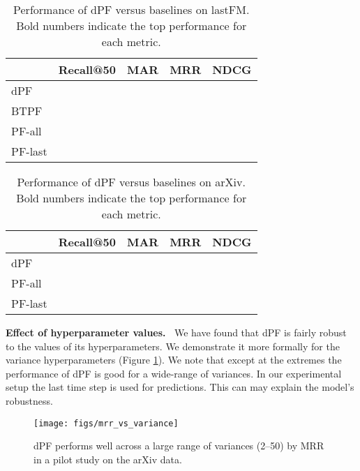 \documentclass{sig-alternate}
\newcommand{\mypar}[1]{\vspace{0.1in}\noindent \textbf{#1 \,}}
\begin{document}
\begin{table}[h]
\begin{center}
\begin{tabular}{p{0.75in}cccc}
\hline
           & Recall@50 & MAR & MRR & NDCG \\ \hline 
dPF        & {\bf } & {\bf } & {\bf } & {\bf } \\ 
BTPF \citep{lxiong:10:bptf}   &  &  &  & \\ 
PF-all \citep{Gopalan:2013b}  &  &  &  & \\ 
PF-last \citep{Gopalan:2013b} &  &  &  & \\ \hline
\end{tabular}
\caption{Performance of dPF versus baselines on lastFM. Bold numbers
indicate the top performance for each metric.}
\label{tab:lastFM}
\end{center}
\end{table}



\begin{table}[h]
\begin{center}
\begin{tabular}{p{0.6in}cccc}
\hline
           & Recall@50 & MAR   & MRR    & NDCG \\ \hline 
dPF        & {\bf } & {\bf }  & {\bf } & {\bf } \\ 
PF-all  \citep{Gopalan:2013b} & & & & \\ 
PF-last \citep{Gopalan:2013b} & & & & \\ \hline
\end{tabular}
\caption{Performance of dPF versus baselines on arXiv. Bold numbers indicate
the top performance for each metric.}
\label{tab:arxiv_2}
\end{center}
\end{table}


\mypar{Effect of hyperparameter values.}
\label{sec:hyperparams}
\noindent
We have found that dPF is fairly robust to the values of its hyperparameters.
We demonstrate it more formally for the variance hyperparameters (Figure
\ref{fig:mrr_vs_variance}). We note that except at the extremes the performance
of dPF is good for a wide-range of variances. In our experimental setup the
last time step is used for predictions. This can may explain the model's
robustness.

\begin{figure}[ht]
\begin{center}
\texttt{[image: figs/mrr\_vs\_variance]}
\end{center}
\caption{dPF performs well across a large range of variances (2--50) by MRR in a pilot study on the arXiv data.}
\label{fig:mrr_vs_variance}
\end{figure}
\end{document}
